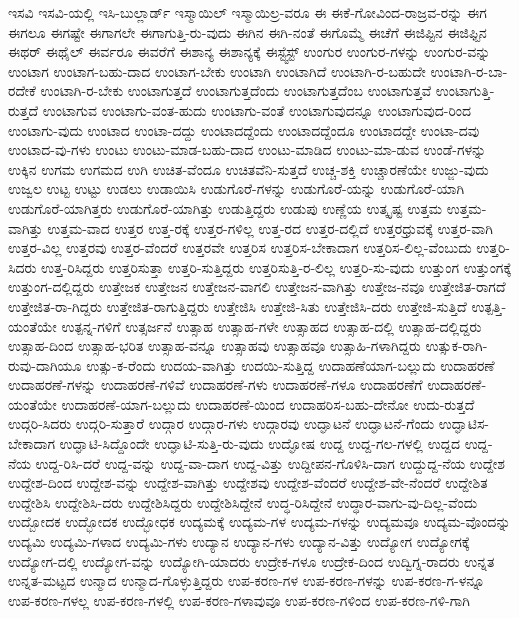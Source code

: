 {ಇಸವಿ
ಇಸವಿ-ಯಲ್ಲಿ
ಇಸಿ-ಬುಲ್ಲಾರ್ಡ್
ಇಸ್ಮಾಯಿಲ್
ಇಸ್ಮಾಯಿಲ್ರ-ವರೂ
ಈ
ಈಕೆ-ಗೋವಿಂದ-ರಾಜ್ರವ-ರನ್ನು
ಈಗ
ಈಗಲೂ
ಈಗಷ್ಟೇ
ಈಗಾಗಲೇ
ಈಗಾಗುತ್ತಿ-ರು-ವುದು
ಈಗಿನ
ಈಗಿ-ನಂತೆ
ಈಗೊಮ್ಮೆ
ಈಚೆಗೆ
ಈಜಿಪ್ಟಿನ
ಈಜಿಫ್ಟಿನ
ಈಥರ್
ಈಥೈಲ್
ಈರ್ವರೂ
ಈವರೆಗೆ
ಈಶಾನ್ಯ
ಈಶಾನ್ಯಕ್ಕೆ
ಈಸ್ಟ್ವೆಸ್ಟ್
ಉಂಗುರ
ಉಂಗುರ-ಗಳನ್ನು
ಉಂಗುರ-ವನ್ನು
ಉಂಟಾಗ
ಉಂಟಾಗ-ಬಹು-ದಾದ
ಉಂಟಾಗ-ಬೇಕು
ಉಂಟಾಗಿ
ಉಂಟಾಗಿದೆ
ಉಂಟಾಗಿ-ರ-ಬಹುದೇ
ಉಂಟಾಗಿ-ರ-ಬಾ-ರದೇಕೆ
ಉಂಟಾಗಿ-ರ-ಬೇಕು
ಉಂಟಾಗುತ್ತದೆ
ಉಂಟಾಗುತ್ತದೆಂದು
ಉಂಟಾಗುತ್ತದೆಂಬ
ಉಂಟಾಗುತ್ತವೆ
ಉಂಟಾಗುತ್ತಿ-ರುತ್ತದೆ
ಉಂಟಾಗುವ
ಉಂಟಾಗು-ವಂತ-ಹುದು
ಉಂಟಾಗು-ವಂತೆ
ಉಂಟಾಗುವುದನ್ನೂ
ಉಂಟಾಗುವುದ-ರಿಂದ
ಉಂಟಾಗು-ವುದು
ಉಂಟಾದ
ಉಂಟಾ-ದದ್ದು
ಉಂಟಾದದ್ದೆಂದು
ಉಂಟಾದದ್ದೆಂದೂ
ಉಂಟಾದದ್ದೇ
ಉಂಟಾ-ದವು
ಉಂಟಾದ-ವು-ಗಳು
ಉಂಟು
ಉಂಟು-ಮಾಡ-ಬಹು-ದಾದ
ಉಂಟು-ಮಾಡಿದ
ಉಂಟು-ಮಾ-ಡುವ
ಉಂಡೆ-ಗಳನ್ನು
ಉಕ್ಕಿನ
ಉಗಮ
ಉಗಮದ
ಉಗಿ
ಉಚಿತ-ವೆಂದೂ
ಉಚಿತವೆನಿ-ಸುತ್ತದೆ
ಉಚ್ಚ-ಶಕ್ತಿ
ಉಚ್ಚಾರಣೆಯೇ
ಉಜ್ಜು-ವುದು
ಉಜ್ವಲ
ಉಟ್ಟ
ಉಟ್ಟು
ಉಡಲು
ಉಡಾಯಿಸಿ
ಉಡುಗೊರೆ-ಗಳನ್ನು
ಉಡುಗೊರೆ-ಯನ್ನು
ಉಡುಗೊರೆ-ಯಾಗಿ
ಉಡುಗೊರೆ-ಯಾಗಿತ್ತರು
ಉಡುಗೊರೆ-ಯಾಗಿತ್ತು
ಉಡುತ್ತಿದ್ದರು
ಉಡುಪು
ಉಣ್ಣೆಯ
ಉತ್ಕೃಷ್ಟ
ಉತ್ತಮ
ಉತ್ತಮ-ವಾಗಿತ್ತು
ಉತ್ತಮ-ವಾದ
ಉತ್ತರ
ಉತ್ತ-ರಕ್ಕೆ
ಉತ್ತರ-ಗಳಿಲ್ಲ
ಉತ್ತ-ರದ
ಉತ್ತರ-ದಲ್ಲಿದೆ
ಉತ್ತರಧ್ರುವಕ್ಕೆ
ಉತ್ತರ-ವಾಗಿ
ಉತ್ತರ-ವಿಲ್ಲ
ಉತ್ತರವು
ಉತ್ತರ-ವೆಂದರೆ
ಉತ್ತರವೇ
ಉತ್ತರಿಸ
ಉತ್ತರಿಸ-ಬೇಕಾದಾಗ
ಉತ್ತರಿಸ-ಲಿಲ್ಲ-ವೆಂಬುದು
ಉತ್ತರಿ-ಸಿದರು
ಉತ್ತ-ರಿಸಿದ್ದರು
ಉತ್ತರಿಸುತ್ತಾ
ಉತ್ತರಿ-ಸುತ್ತಿದ್ದರು
ಉತ್ತರಿಸುತ್ತಿ-ರ-ಲಿಲ್ಲ
ಉತ್ತರಿ-ಸು-ವುದು
ಉತ್ತುಂಗ
ಉತ್ತುಂಗಕ್ಕೆ
ಉತ್ತುಂಗ-ದಲ್ಲಿದ್ದರು
ಉತ್ತೇಜಕ
ಉತ್ತೇಜನ
ಉತ್ತೇಜನ-ವಾಗಲಿ
ಉತ್ತೇಜನ-ವಾಗಿತ್ತು
ಉತ್ತೇಜ-ನವೂ
ಉತ್ತೇಜಿತ-ರಾಗದೆ
ಉತ್ತೇಜಿತ-ರಾ-ಗಿದ್ದರು
ಉತ್ತೇಜಿತ-ರಾಗುತ್ತಿದ್ದರು
ಉತ್ತೇಜಿಸಿ
ಉತ್ತೇಜಿ-ಸಿತು
ಉತ್ತೇಜಿಸಿ-ದರು
ಉತ್ತೇಜಿ-ಸುತ್ತಿದೆ
ಉತ್ಪತ್ತಿ-ಯಂತೆಯೇ
ಉತ್ಪನ್ನ-ಗಳಿಗೆ
ಉತ್ಸರ್ಜನೆ
ಉತ್ಸಾಹ
ಉತ್ಸಾಹ-ಗಳೇ
ಉತ್ಸಾಹದ
ಉತ್ಸಾಹ-ದಲ್ಲಿ
ಉತ್ಸಾಹ-ದಲ್ಲಿದ್ದರು
ಉತ್ಸಾಹ-ದಿಂದ
ಉತ್ಸಾಹ-ಭರಿತ
ಉತ್ಸಾಹ-ವನ್ನೂ
ಉತ್ಸಾಹವು
ಉತ್ಸಾಹವೂ
ಉತ್ಸಾಹಿ-ಗಳಾಗಿದ್ದರು
ಉತ್ಸುಕ-ರಾಗಿ-ರುವು-ದಾಗಿಯೂ
ಉತ್ಸು-ಕ-ರೆಂದು
ಉದಯ-ವಾಗಿತ್ತು
ಉದಯಿ-ಸುತ್ತಿದ್ದ
ಉದಾಹಣೆಯಾಗ-ಬಲ್ಲುದು
ಉದಾಹರಣೆ
ಉದಾಹರಣೆ-ಗಳನ್ನು
ಉದಾಹರಣೆ-ಗಳಿವೆ
ಉದಾಹರಣೆ-ಗಳು
ಉದಾಹರಣೆ-ಗಳೂ
ಉದಾಹರಣೆಗೆ
ಉದಾಹರಣೆ-ಯಂತೆಯೇ
ಉದಾಹರಣೆ-ಯಾಗ-ಬಲ್ಲುದು
ಉದಾಹರಣೆ-ಯಿಂದ
ಉದಾಹರಿಸ-ಬಹು-ದೇನೋ
ಉದು-ರುತ್ತದೆ
ಉದ್ಗರಿ-ಸಿದರು
ಉದ್ಗರಿ-ಸುತ್ತಾರೆ
ಉದ್ಗಾರ
ಉದ್ಗಾರ-ಗಳು
ಉದ್ಗಾರವು
ಉದ್ಘಾಟನೆ
ಉದ್ಘಾಟನೆ-ಗೆಂದು
ಉದ್ಘಾಟಿಸ-ಬೇಕಾದಾಗ
ಉದ್ಘಾಟಿ-ಸಿದ್ದೊಂದೇ
ಉದ್ಘಾಟಿ-ಸುತ್ತಿ-ರು-ವುದು
ಉದ್ಘೋಷ
ಉದ್ದ
ಉದ್ದ-ಗಲ-ಗಳಲ್ಲಿ
ಉದ್ದದ
ಉದ್ದ-ನೆಯ
ಉದ್ದ-ರಿಸಿ-ದರೆ
ಉದ್ದ-ವನ್ನು
ಉದ್ದ-ವಾ-ದಾಗ
ಉದ್ದ-ವಿತ್ತು
ಉದ್ದೀಪನ-ಗೊಳಿಸಿ-ದಾಗ
ಉದ್ದುದ್ದ-ನೆಯ
ಉದ್ದೇಶ
ಉದ್ದೇಶ-ದಿಂದ
ಉದ್ದೇಶ-ವನ್ನು
ಉದ್ದೇಶ-ವಾಗಿತ್ತು
ಉದ್ದೇಶವು
ಉದ್ದೇಶ-ವೆಂದರೆ
ಉದ್ದೇಶ-ವೇ-ನೆಂದರೆ
ಉದ್ದೇಶಿತ
ಉದ್ದೇಶಿಸಿ
ಉದ್ದೇಶಿಸಿ-ದರು
ಉದ್ದೇಶಿಸಿದ್ದರು
ಉದ್ದೇಶಿಸಿದ್ದೇನೆ
ಉದ್ಧ-ರಿಸಿದ್ದೇನೆ
ಉದ್ಧಾರ-ವಾಗು-ವು-ದಿಲ್ಲ-ವೆಂದು
ಉದ್ಬೋದಕ
ಉದ್ಭೋದಕ
ಉದ್ಭೋಧಕ
ಉದ್ಯಮಕ್ಕೆ
ಉದ್ಯಮ-ಗಳ
ಉದ್ಯಮ-ಗಳನ್ನು
ಉದ್ಯಮವೂ
ಉದ್ಯಮ-ವೊಂದನ್ನು
ಉದ್ಯಮಿ
ಉದ್ಯಮಿ-ಗಳಾದ
ಉದ್ಯಮಿ-ಗಳು
ಉದ್ಯಾನ
ಉದ್ಯಾನ-ಗಳು
ಉದ್ಯಾನ-ವಿತ್ತು
ಉದ್ಯೋಗ
ಉದ್ಯೋಗಕ್ಕೆ
ಉದ್ಯೋಗ-ದಲ್ಲಿ
ಉದ್ಯೋಗ-ವನ್ನು
ಉದ್ಯೋಗಿ-ಯಾದರು
ಉದ್ರೇಕ-ಗಳೂ
ಉದ್ರೇಕ-ದಿಂದ
ಉದ್ವಿಗ್ನ-ರಾದರು
ಉನ್ನತ
ಉನ್ನತ-ಮಟ್ಟದ
ಉನ್ಮಾದ
ಉನ್ಮಾದ-ಗೊಳ್ಳುತ್ತಿದ್ದರು
ಉಪ-ಕರಣ-ಗಳ
ಉಪ-ಕರಣ-ಗಳನ್ನು
ಉಪ-ಕರಣ-ಗ-ಳನ್ನೂ
ಉಪ-ಕರಣ-ಗಳಲ್ಲ
ಉಪ-ಕರಣ-ಗಳಲ್ಲಿ
ಉಪ-ಕರಣ-ಗಳಾವುವೂ
ಉಪ-ಕರಣ-ಗಳಿಂದ
ಉಪ-ಕರಣ-ಗಳಿ-ಗಾಗಿ
}
